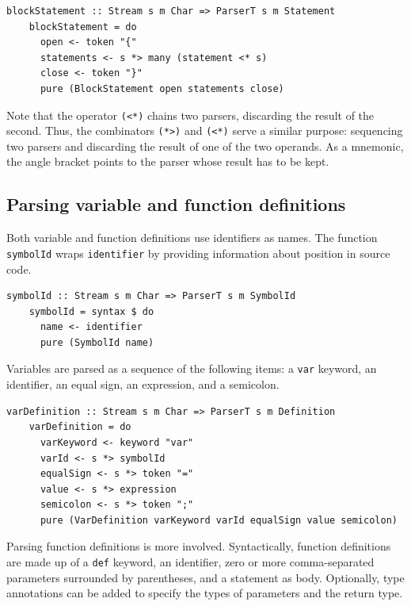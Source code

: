 \documentclass[UdineBachThesis,american,11pt]{PhdThesis}
\begin{document}
  \begin{Verbatim}[gobble=4,fontsize=\small]
    blockStatement :: Stream s m Char => ParserT s m Statement
    blockStatement = do
      open <- token "{"
      statements <- s *> many (statement <* s)
      close <- token "}"
      pure (BlockStatement open statements close)
  \end{Verbatim}

  Note that the operator \mbox{\texttt{(<*)}} chains two parsers, discarding the
  result of the second. Thus, the combinators \mbox{\texttt{(*>)}} and
  \mbox{\texttt{(<*)}} serve a similar purpose: sequencing two parsers and
  discarding the result of one of the two operands. As a mnemonic, the angle
  bracket points to the parser whose result has to be kept.

  \newpage

  \subsection{Parsing variable and function definitions}

  Both variable and function definitions use identifiers as names. The function
  \mbox{\texttt{symbolId}} wraps \mbox{\texttt{identifier}} by providing
  information about position in source code.

  \begin{Verbatim}[gobble=4,fontsize=\small]
    symbolId :: Stream s m Char => ParserT s m SymbolId
    symbolId = syntax $ do
      name <- identifier
      pure (SymbolId name)
  \end{Verbatim}

  Variables are parsed as a sequence of the following items: a
  \mbox{\texttt{var}} keyword, an identifier, an equal sign, an expression, and
  a semicolon.

  \begin{Verbatim}[gobble=4,fontsize=\small]
    varDefinition :: Stream s m Char => ParserT s m Definition
    varDefinition = do
      varKeyword <- keyword "var"
      varId <- s *> symbolId
      equalSign <- s *> token "="
      value <- s *> expression
      semicolon <- s *> token ";"
      pure (VarDefinition varKeyword varId equalSign value semicolon)
  \end{Verbatim}

  Parsing function definitions is more involved. Syntactically, function
  definitions are made up of a \mbox{\texttt{def}} keyword, an identifier, zero
  or more comma-separated parameters surrounded by parentheses, and a statement
  as body. Optionally, type annotations can be added to specify the types of
  parameters and the return type.
\end{document}
